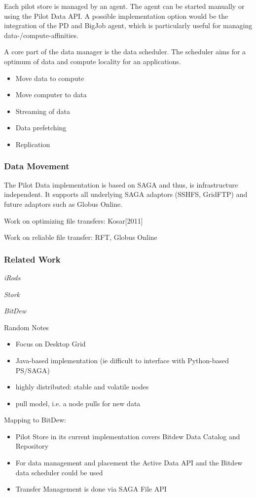 \documentclass[conference,final]{IEEEtran}
\begin{document}
Each pilot store is managed by an agent. The agent can be started manually or 
using the Pilot Data API. A possible implementation option would be the 
integration of the PD and BigJob agent, which is particularly useful for 
managing data-/compute-affinities.

A core part of the data manager is the data scheduler. The scheduler aims for a 
optimum of data and compute locality for an applications.
\begin{itemize}
	\item Move data to compute
	\item Move computer to data
	\item Streaming of data
	\item Data prefetching 
	\item Replication
\end{itemize}



\subsubsection{Data Movement}

The Pilot Data implementation is based on SAGA and thus, is infrastructure
independent. It supports all underlying SAGA adaptors (SSHFS, GridFTP) and
future adaptors such as Globus Online.

Work on optimizing file transfers: Kosar[2011]

Work on reliable file transfer: RFT, Globus Online


\subsubsection{Related Work}

\emph{iRods}


\emph{Stork}


\emph{BitDew}

Random Notes
\begin{itemize}
	\item Focus on Desktop Grid
	\item Java-based implementation (ie difficult to interface with Python-based PS/SAGA)
	\item highly distributed: stable and volatile nodes
	\item pull model, i.e. a node pulls for new data
\end{itemize}


Mapping to BitDew:
\begin{itemize}
	\item Pilot Store in its current implementation covers Bitdew Data Catalog and Repository
	\item For data management and placement the Active Data API and the Bitdew data scheduler could be used
	\item Transfer Management is done via SAGA File API	
\end{itemize}
\end{document}
